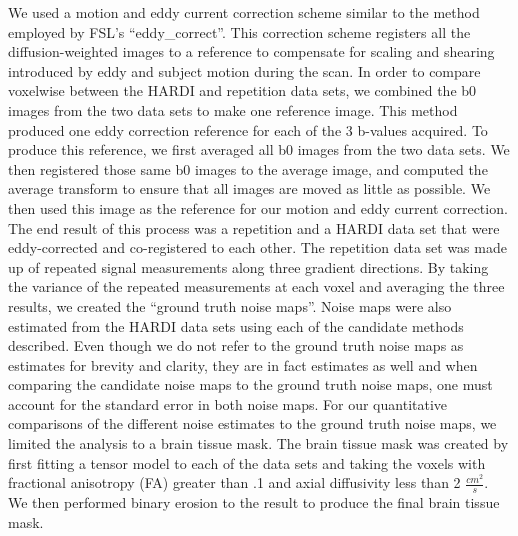 We used a motion and eddy current correction scheme similar to the
method employed by FSL's ``eddy\_correct''. This correction scheme
registers all the diffusion-weighted images to a reference to compensate
for scaling and shearing introduced by eddy and subject motion during
the scan. In order to compare voxelwise between the HARDI and repetition
data sets, we combined the b0 images from the two data sets to make one
reference image. This method produced one eddy correction reference for
each of the 3 b-values acquired. To produce this reference, we first
averaged all b0 images from the two data sets. We then registered those
same b0 images to the average image, and computed the average transform
to ensure that all images are moved as little as possible. We then used
this image as the reference for our motion and eddy current correction.
The end result of this process was a repetition and a HARDI data set
that were eddy-corrected and co-registered to each other. The repetition
data set was made up of repeated signal measurements along three
gradient directions. By taking the variance of the repeated measurements
at each voxel and averaging the three results, we created the ``ground
truth noise maps''. Noise maps were also estimated from the HARDI data
sets using each of the candidate methods described. Even though we do
not refer to the ground truth noise maps as estimates for brevity and
clarity, they are in fact estimates as well and when comparing the
candidate noise maps to the ground truth noise maps, one must account
for the standard error in both noise maps. For our quantitative
comparisons of the different noise estimates to the ground truth noise
maps, we limited the analysis to a brain tissue mask. The brain tissue
mask was created by first fitting a tensor model to each of the data
sets and taking the voxels with fractional anisotropy (FA) greater than
.1 and axial diffusivity less than 2 \(\frac{cm^{2}}{s}\). We then
performed binary erosion to the result to produce the final brain tissue
mask.
